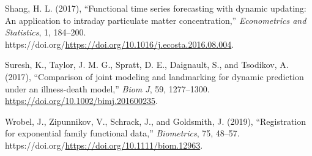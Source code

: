 \documentclass[
  11pt,
]{article}
\newlength{\cslhangindent}
\newlength{\cslentryspacingunit} %
\newenvironment{CSLReferences}[2] %
 {%
  \setlength{\parindent}{0pt}
  \ifodd #1
  \let\oldpar\par
  \def\par{\hangindent=\cslhangindent\oldpar}
  \fi
  \setlength{\parskip}{#2\cslentryspacingunit}
 }%
 {}
\begin{document}
\begin{CSLReferences}{1}{0}
\leavevmode{}%
Shang, H. L. (2017), {``Functional time series forecasting with dynamic
updating: An application to intraday particulate matter
concentration,''} \emph{Econometrics and Statistics}, 1, 184--200.
https://doi.org/\url{https://doi.org/10.1016/j.ecosta.2016.08.004}.

\leavevmode{}%
Suresh, K., Taylor, J. M. G., Spratt, D. E., Daignault, S., and
Tsodikov, A. (2017), {``Comparison of joint modeling and landmarking for
dynamic prediction under an illness-death model,''} \emph{Biom J}, 59,
1277--1300. \url{https://doi.org/10.1002/bimj.201600235}.

\leavevmode{}%
Wrobel, J., Zipunnikov, V., Schrack, J., and Goldsmith, J. (2019),
{``Registration for exponential family functional data,''}
\emph{Biometrics}, 75, 48--57.
https://doi.org/\url{https://doi.org/10.1111/biom.12963}.

\end{CSLReferences}
\end{document}

